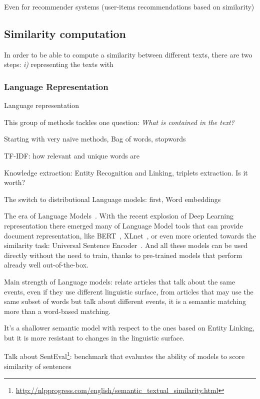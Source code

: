 Even for recommender systems (user-items recommendations based on similarity)

\subsection{Similarity computation}
In order to be able to compute a similarity between different texts, there are two steps: \emph{i)} representing the texts with 

\subsubsection{Language Representation}
Language representation

This group of methods tackles one question: \emph{What is contained in the text?}

Starting with very naive methods,
Bag of words, stopwords

TF-IDF: how relevant and unique words are\cite{jones1972statistical,ramos2003using}

Knowledge extraction: Entity Recognition and Linking, triplets extraction. Is it worth?

The switch to distributional Language models:
first, Word embeddings

The era of Language Models~\cite{devlin2018bert,cer2018universal,yang2019xlnet}.
With the recent explosion of Deep Learning representation there emerged many of Language Model tools that can provide document representation, like BERT~\cite{devlin2018bert}, XLnet~\cite{yang2019xlnet}, or even more oriented towards the similarity task: Universal Sentence Encoder~\cite{cer2018universal}.
And all these models can be used directly without the need to train, thanks to pre-trained models that perform already well out-of-the-box.

Main strength of Language models:
relate articles that talk about the same events, even if they use different linguistic surface, from articles that may use the same subset of words but talk about different events, it is a semantic matching more than a word-based matching. 

It's a shallower semantic model with respect to the ones based on Entity Linking, but it is more resistant to changes in the linguistic surface.

Talk about SentEval\footnote{\url{http://nlpprogress.com/english/semantic_textual_similarity.html}}: benchmark that evaluates the ability of models to score similarity of sentences


